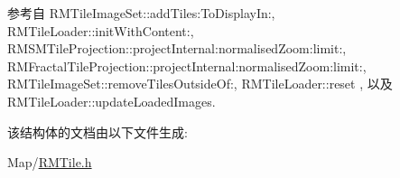 参考自 R\-M\-Tile\-Image\-Set\-::add\-Tiles\-:\-To\-Display\-In\-:, R\-M\-Tile\-Loader\-::init\-With\-Content\-:, R\-M\-S\-M\-Tile\-Projection\-::project\-Internal\-:normalised\-Zoom\-:limit\-:, R\-M\-Fractal\-Tile\-Projection\-::project\-Internal\-:normalised\-Zoom\-:limit\-:, R\-M\-Tile\-Image\-Set\-::remove\-Tiles\-Outside\-Of\-:, R\-M\-Tile\-Loader\-::reset , 以及 R\-M\-Tile\-Loader\-::update\-Loaded\-Images.



该结构体的文档由以下文件生成\-:\begin{DoxyCompactItemize}
\item 
Map/\hyperlink{_r_m_tile_8h}{R\-M\-Tile.\-h}\end{DoxyCompactItemize}
